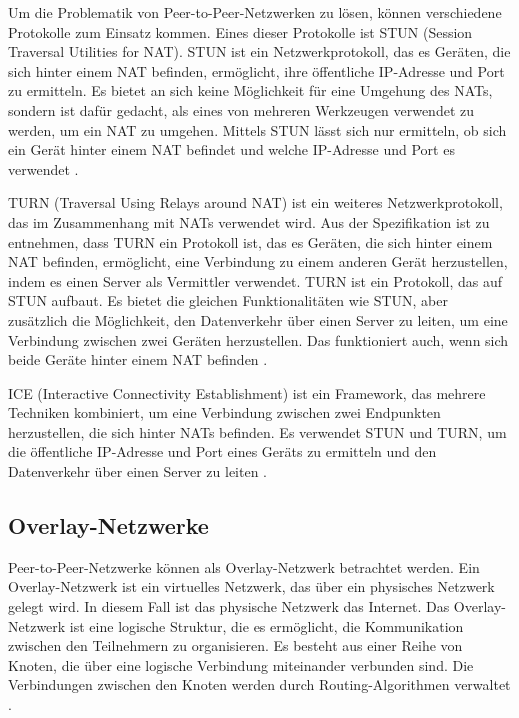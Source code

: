 Um die Problematik von Peer-to-Peer-Netzwerken zu lösen, können verschiedene Protokolle zum Einsatz kommen. Eines dieser Protokolle ist STUN (Session Traversal Utilities for NAT). STUN ist ein Netzwerkprotokoll, das es Geräten, die sich hinter einem NAT befinden, ermöglicht, ihre öffentliche IP-Adresse und Port zu ermitteln. Es bietet an sich keine Möglichkeit für eine Umgehung des NATs, sondern ist dafür gedacht, als eines von mehreren Werkzeugen verwendet zu werden, um ein NAT zu umgehen. Mittels STUN lässt sich nur ermitteln, ob sich ein Gerät hinter einem NAT befindet und welche IP-Adresse und Port es verwendet \parencite[S. 4]{rfc8489_STUN}.

TURN (Traversal Using Relays around NAT) ist ein weiteres Netzwerkprotokoll, das im Zusammenhang mit NATs verwendet wird. Aus der Spezifikation ist zu entnehmen, dass TURN ein Protokoll ist, das es Geräten, die sich hinter einem NAT befinden, ermöglicht, eine Verbindung zu einem anderen Gerät herzustellen, indem es einen Server als Vermittler verwendet. TURN ist ein Protokoll, das auf STUN aufbaut. Es bietet die gleichen Funktionalitäten wie STUN, aber zusätzlich die Möglichkeit, den Datenverkehr über einen Server zu leiten, um eine Verbindung zwischen zwei Geräten herzustellen. Das funktioniert auch, wenn sich beide Geräte hinter einem NAT befinden \parencite[S. 7]{rfc8656_TURN}.

ICE (Interactive Connectivity Establishment) ist ein Framework, das mehrere Techniken kombiniert, um eine Verbindung zwischen zwei Endpunkten herzustellen, die sich hinter NATs befinden. Es verwendet STUN und TURN, um die öffentliche IP-Adresse und Port eines Geräts zu ermitteln und den Datenverkehr über einen Server zu leiten \Parencite[S. 6]{rfc8445_ICE}.


\subsection{Overlay-Netzwerke}

Peer-to-Peer-Netzwerke können als Overlay-Netzwerk betrachtet werden. Ein Overlay-Netzwerk ist ein virtuelles Netzwerk, das über ein physisches Netzwerk gelegt wird. In diesem Fall ist das physische Netzwerk das Internet. Das Overlay-Netzwerk ist eine logische Struktur, die es ermöglicht, die Kommunikation zwischen den Teilnehmern zu organisieren. Es besteht aus einer Reihe von Knoten, die über eine logische Verbindung miteinander verbunden sind. Die Verbindungen zwischen den Knoten werden durch Routing-Algorithmen verwaltet \parencite{Lua_P2POverlayNetworksPaper}. 

